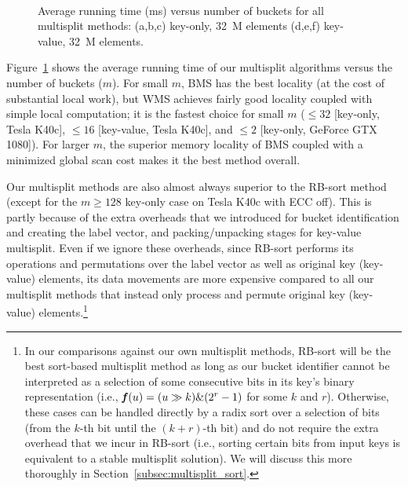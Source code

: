 \begin{figure}
\centering
{}
\\
\caption{Average running time (ms) versus number of buckets for all multisplit methods: (a,b,c) key-only, 32~M elements (d,e,f) key-value, 32~M elements.} \label{fig:avg_time}
\end{figure}

Figure~\ref{fig:avg_time} shows the average running time of our multisplit algorithms versus the number of buckets ($m$).
For small $m$, BMS has the best locality (at the cost of substantial local work), but WMS achieves fairly good locality coupled with simple local computation; it is the fastest choice for small $m$ ($\leq 32$ [key-only, Tesla K40c], $\leq 16$ [key-value, Tesla K40c], and $\leq2$ [key-only, GeForce GTX 1080]).
For larger $m$, the superior memory locality of BMS coupled with a minimized global scan cost makes it the best method overall.

Our multisplit methods are also almost always superior to the RB-sort method (except for the $m \geq 128$ key-only case on Tesla K40c with ECC off).
This is partly because of the extra overheads that we introduced for bucket identification and creating the label vector, and packing/unpacking stages for key-value multisplit.
Even if we ignore these overheads, since RB-sort performs its operations and permutations over the label vector as well as original key (key-value) elements, its data movements are more expensive compared to all our multisplit methods that instead only process and permute original key (key-value) elements.\footnote{In our comparisons against our own multisplit methods, RB-sort will be the best sort-based multisplit method as long as our bucket identifier cannot be interpreted as a selection of some consecutive bits in its key's binary representation (i.e., $\defn{f}(u) = (u \gg k) \& (2^{r}-1)$ for some $k$ and $r$). Otherwise, these cases can be handled directly by a radix sort over a selection of bits (from the $k$-th bit until the $(k+r)$-th bit) and do not require the extra overhead that we incur in RB-sort (i.e., sorting certain bits from input keys is equivalent to a stable multisplit solution). We will discuss this more thoroughly in Section~\ref{subsec:multisplit_sort}.}

